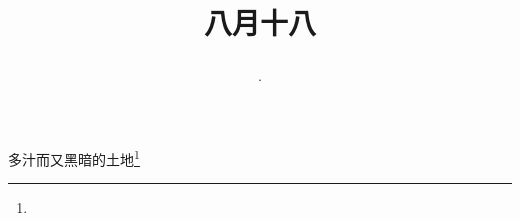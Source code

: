 \title{\date[d=20,m=9,y=2024][year:cn-y,年,month:cn,day:cn,日,·,weekday]·八月十八 }
多汁而又黑暗的土地\footnote{ }

